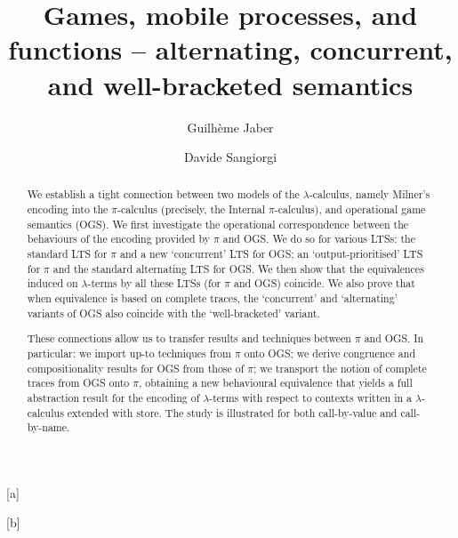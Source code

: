 \documentclass{lmcs}
\theoremstyle{plain}
\theoremstyle{definition}
\begin{document}
\title[Games, mobile processes, and functions]{Games, mobile processes, and functions -- alternating, concurrent, and
well-bracketed semantics}

\author[G.~Jaber]{Guilhème Jaber}[a]
\author[D.~Sangiorgi]{Davide Sangiorgi}[b]





\address{Nantes Université, École Centrale Nantes, CNRS, INRIA, LS2N, UMR 6004, France}


\address{Università di Bologna, Italy  and INRIA,   France}





\begin{abstract}
 We establish a tight connection between two models of the $\lambda$-calculus, 
 namely Milner's encoding into the $\pi$-calculus (precisely, the Internal $\pi$-calculus), 
 and operational game semantics (OGS).
 We first investigate the operational correspondence between 
 the behaviours of the encoding provided by
 $\pi$ and OGS. 
 We do so for various LTSs:  the standard LTS for  
 $\pi$ and a new 
 `concurrent' LTS for OGS;  an `output-prioritised' LTS for  $\pi$ 
 and the standard alternating LTS for OGS.  We then show that the equivalences induced on
 $\lambda$-terms by all these LTSs (for $\pi$ and OGS) coincide. 
 We also prove that when equivalence is based on complete traces,  
 the `concurrent' and `alternating' variants of   OGS 
 also coincide with the `well-bracketed' variant. 

 These connections allow us to transfer results and techniques between $\pi$ and OGS. In
 particular: 
 we import up-to techniques from $\pi$ onto OGS; we derive
 congruence and compositionality results for OGS from those of $\pi$; 
 we transport the notion of complete traces from OGS onto $\pi$, obtaining a new  
 behavioural equivalence that yields a full abstraction result for the encoding of
 $\lambda$-terms with respect to contexts written in a $\lambda$-calculus extended with store. 
%
 The study is illustrated for both call-by-value and call-by-name.
\end{abstract}
\end{document}
